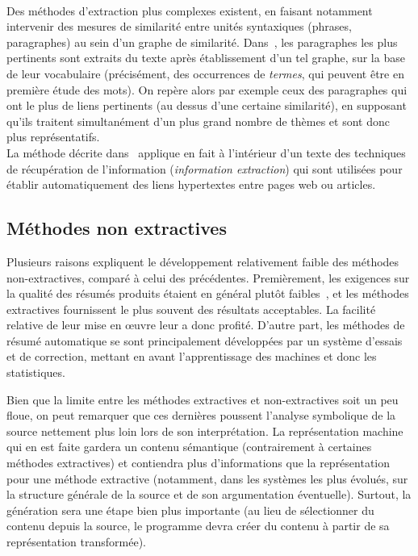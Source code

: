 \documentclass{article}           %
\begin{document}
\paragraph{}
Des méthodes d'extraction plus complexes existent, en faisant notamment intervenir des mesures de similarité entre unités syntaxiques (phrases, paragraphes) au sein d'un graphe de similarité. Dans~\cite{salton_automatic_1997}, les paragraphes les plus pertinents sont extraits du texte après établissement d'un tel graphe, sur la base de leur vocabulaire (précisément, des occurrences de \emph{termes}, qui peuvent être en première étude des mots). On repère alors par exemple ceux des paragraphes qui ont le plus de liens pertinents (au dessus d'une certaine similarité), en supposant qu'ils traitent simultanément d'un plus grand nombre de thèmes et sont donc plus représentatifs.\\

La méthode décrite dans~\cite{salton_automatic_1997} applique en fait à l'intérieur d'un texte des techniques de récupération  de l'information (\emph{information extraction}) qui sont utilisées pour établir automatiquement des liens hypertextes entre pages web ou articles.


\subsection{Méthodes non extractives}

Plusieurs raisons expliquent le développement relativement faible des méthodes non-extractives, comparé à celui des précédentes. Premièrement, les exigences sur la qualité des résumés produits étaient en général plutôt faibles~\cite{jones_automatic_2007}, et les méthodes extractives fournissent le plus souvent des résultats acceptables. La facilité relative de leur mise en œuvre leur a donc profité. D'autre part, les méthodes de résumé automatique se sont principalement développées par un système d'essais et de correction, mettant en avant l'apprentissage des machines et donc les statistiques.

Bien que la limite entre les méthodes extractives et non-extractives soit un peu floue, on peut remarquer que ces dernières poussent l'analyse symbolique de la source nettement plus loin lors de son interprétation. La représentation machine qui en est faite gardera un contenu sémantique (contrairement à certaines méthodes extractives) et contiendra plus d'informations que la représentation pour une méthode extractive (notamment, dans les systèmes les plus évolués, sur la structure générale de la source et de son argumentation éventuelle). Surtout, la génération sera une étape bien plus importante (au lieu de sélectionner du contenu depuis la source, le programme devra créer du contenu à partir de sa représentation transformée).
\end{document}
